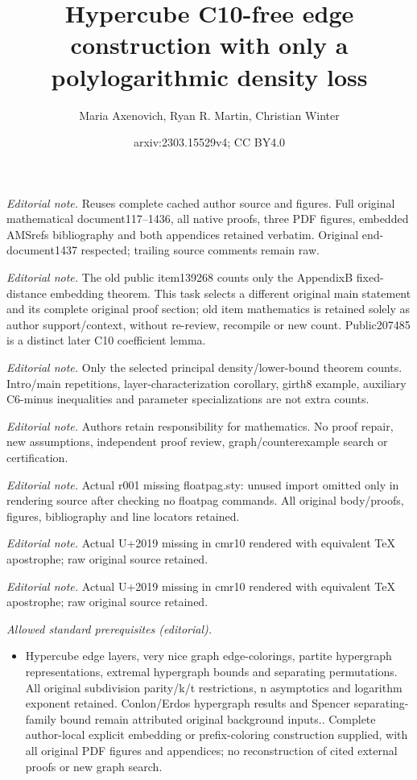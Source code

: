 \documentclass[11pt, a4paper]{article}
\title{Hypercube C10-free edge construction with only a polylogarithmic density loss}
\author{Maria Axenovich, Ryan R. Martin, Christian Winter}
\date{arxiv:2303.15529v4; CC BY4.0}
\begin{document}
\maketitle
\noindent\textit{Editorial note.} Reuses complete cached author source and figures. Full original mathematical document117--1436, all native proofs, three PDF figures, embedded AMSrefs bibliography and both appendices retained verbatim. Original end-document1437 respected; trailing source comments remain raw.\par\medskip
\noindent\textit{Editorial note.} The old public item139268 counts only the AppendixB fixed-distance embedding theorem. This task selects a different original main statement and its complete original proof section; old item mathematics is retained solely as author support/context, without re-review, recompile or new count. Public207485 is a distinct later C10 coefficient lemma.\par\medskip
\noindent\textit{Editorial note.} Only the selected principal density/lower-bound theorem counts. Intro/main repetitions, layer-characterization corollary, girth8 example, auxiliary C6-minus inequalities and parameter specializations are not extra counts.\par\medskip
\noindent\textit{Editorial note.} Authors retain responsibility for mathematics. No proof repair, new assumptions, independent proof review, graph/counterexample search or certification.\par\medskip
\noindent\textit{Editorial note.} Actual r001 missing floatpag.sty: unused import omitted only in rendering source after checking no floatpag commands. All original body/proofs, figures, bibliography and line locators retained.\par\medskip
\noindent\textit{Editorial note.} Actual U+2019 missing in cmr10 rendered with equivalent TeX apostrophe; raw original source retained.\par\medskip
\noindent\textit{Editorial note.} Actual U+2019 missing in cmr10 rendered with equivalent TeX apostrophe; raw original source retained.\par\medskip
\noindent\textit{Allowed standard prerequisites (editorial).}\begin{itemize}
\item Hypercube edge layers, very nice graph edge-colorings, partite hypergraph representations, extremal hypergraph bounds and separating permutations. All original subdivision parity/k/t restrictions, n asymptotics and logarithm exponent retained. Conlon/Erdos hypergraph results and Spencer separating-family bound remain attributed original background inputs.. Complete author-local explicit embedding or prefix-coloring construction supplied, with all original PDF figures and appendices; no reconstruction of cited external proofs or new graph search.
\end{itemize}\medskip
\end{document}
